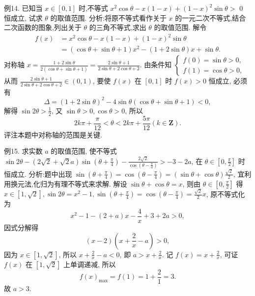 例14. 已知当 $x \in[0,1]$ 时,不等式 $x^2 \cos \theta-x(1-x)+(1-x)^2 \sin \theta>$ 0 恒成立, 试求 $\theta$ 的取值范围.
分析:将原不等式看作关于 $x$ 的一元二次不等式,结合二次函数的图象,列出关于 $\theta$ 的三角不等式,求出 $\theta$ 的取值范围.
解令
$$
\begin{aligned}
f(x) & =x^2 \cos \theta-x(1-x)+(1-x)^2 \sin \theta \\
& =(\cos \theta+\sin \theta+1) x^2-(1+2 \sin \theta) x+\sin \theta .
\end{aligned}
$$
对称轴 $x=\frac{1+2 \sin \theta}{2(\cos \theta+\sin \theta+1)}=\frac{2 \sin \theta+1}{2 \sin \theta+2 \cos \theta+2}$.
由条件知 $\left\{\begin{array}{l}f(0)=\sin \theta>0, \\ f(1)=\cos \theta>0,\end{array}\right.$ 从而 $\frac{2 \sin \theta+1}{2 \sin \theta+2 \cos \theta+2} \in(0,1)$, 要使 $f(x)$ 在 $[0,1]$ 时 $f(x)>0$ 恒成立, 必须有
$$
\Delta=(1+2 \sin \theta)^2-4 \sin \theta(\cos \theta+\sin \theta+1)<0,
$$
解得 $\sin 2 \theta>\frac{1}{2}$, 又 $\sin \theta>0, \cos \theta>0$, 所以
$$
2 k \pi+\frac{\pi}{12}<\theta<2 k \pi+\frac{5 \pi}{12}(k \in \mathbf{Z}) .
$$
评注本题中对称轴的范围是关键.



例15. 求实数 $a$ 的取值范围, 使不等式 $\sin 2 \theta-(2 \sqrt{2}+\sqrt{2} a) \sin \left(\theta+\frac{\pi}{4}\right)- \frac{2 \sqrt{2}}{\cos \left(\theta-\frac{\pi}{4}\right)}>-3-2 a$, 在 $\theta \in\left[0, \frac{\pi}{2}\right]$ 时恒成立.
分析:题中出现 $\sin \left(\theta+\frac{\pi}{4}\right)=\cos \left(\theta-\frac{\pi}{4}\right)=(\sin \theta+\cos \theta) \frac{\sqrt{2}}{2}$, 宜利用换元法,化归为有理不等式来求解.
解设 $\sin \theta+\cos \theta=x$, 则由 $\theta \in\left[0, \frac{\pi}{2}\right]$ 得 $x \in[1, \sqrt{2}], \sin 2 \theta= x^2-1, \sin \left(\theta+\frac{\pi}{4}\right)=\cos \left(\theta-\frac{\pi}{4}\right)=\frac{\sqrt{2}}{2} x$, 原不等式化为
$$
x^2-1-(2+a) x-\frac{4}{x}+3+2 a>0,
$$
因式分解得
$$
(x-2)\left(x+\frac{2}{x}-a\right)>0,
$$
因为 $x \in[1, \sqrt{2}]$, 所以 $x+\frac{2}{x}-a<0$, 即 $a>x+\frac{2}{x}$.
记 $f(x)=x+\frac{2}{x}$, 可证 $f(x)$ 在 $[1, \sqrt{2}]$ 上单调递减, 所以
$$
f(x)_{\max }=f(1)=1+\frac{2}{1}=3 .
$$
故 $a>3$.



